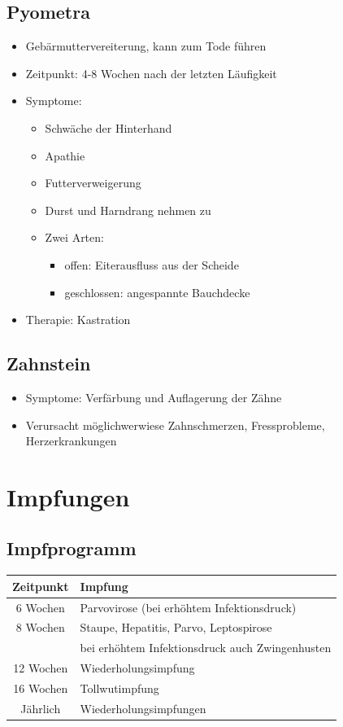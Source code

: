     \subsection{Pyometra}
    \begin{itemize}
        \item Gebärmuttervereiterung, kann zum Tode führen
        \item Zeitpunkt: 4-8 Wochen nach der letzten Läufigkeit
        \item Symptome:
        \begin{itemize}
            \item Schwäche der Hinterhand
            \item Apathie
            \item Futterverweigerung
            \item Durst und Harndrang nehmen zu
            \item Zwei Arten:
            \begin{itemize}
                \item offen: Eiterausfluss aus der Scheide
                \item geschlossen: angespannte Bauchdecke
            \end{itemize}
        \end{itemize}
        \item Therapie: Kastration
    \end{itemize}

    \subsection{Zahnstein}
    \begin{itemize}
        \item Symptome: Verfärbung und Auflagerung der Zähne
        \item Verursacht möglichwerwiese Zahnschmerzen, Fressprobleme, Herzerkrankungen
    \end{itemize}


\section{Impfungen}

    \subsection{Impfprogramm}
    \begin{tabular}{c|l}
        \textbf{Zeitpunkt} &   \textbf{Impfung} \\
        \hline
        6 Wochen    & Parvovirose (bei erhöhtem Infektionsdruck) \\
        8 Wochen    & Staupe, Hepatitis, Parvo, Leptospirose \\
                    & bei erhöhtem Infektionsdruck auch Zwingenhusten \\
        12 Wochen   & Wiederholungsimpfung \\
        16 Wochen   & Tollwutimpfung \\
        Jährlich    & Wiederholungsimpfungen \\
    \end{tabular}

